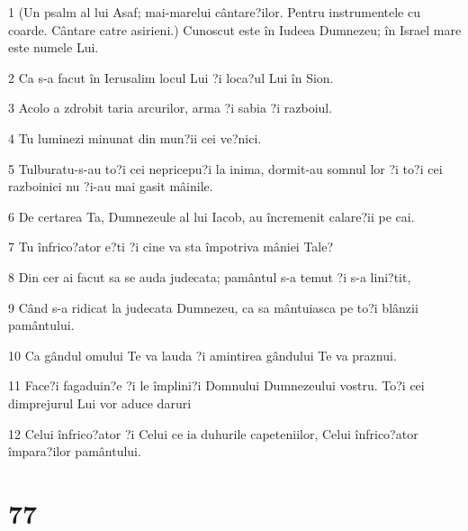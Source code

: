 \par 1 (Un psalm al lui Asaf; mai-marelui cântare?ilor. Pentru instrumentele cu coarde. Cântare catre asirieni.) Cunoscut este în Iudeea Dumnezeu; în Israel mare este numele Lui.
\par 2 Ca s-a facut în Ierusalim locul Lui ?i loca?ul Lui în Sion.
\par 3 Acolo a zdrobit taria arcurilor, arma ?i sabia ?i razboiul.
\par 4 Tu luminezi minunat din mun?ii cei ve?nici.
\par 5 Tulburatu-s-au to?i cei nepricepu?i la inima, dormit-au somnul lor ?i to?i cei razboinici nu ?i-au mai gasit mâinile.
\par 6 De certarea Ta, Dumnezeule al lui Iacob, au încremenit calare?ii pe cai.
\par 7 Tu înfrico?ator e?ti ?i cine va sta împotriva mâniei Tale?
\par 8 Din cer ai facut sa se auda judecata; pamântul s-a temut ?i s-a lini?tit,
\par 9 Când s-a ridicat la judecata Dumnezeu, ca sa mântuiasca pe to?i blânzii pamântului.
\par 10 Ca gândul omului Te va lauda ?i amintirea gândului Te va praznui.
\par 11 Face?i fagaduin?e ?i le împlini?i Domnului Dumnezeului vostru. To?i cei dimprejurul Lui vor aduce daruri
\par 12 Celui înfrico?ator ?i Celui ce ia duhurile capeteniilor, Celui înfrico?ator împara?ilor pamântului.

\chapter{77}

